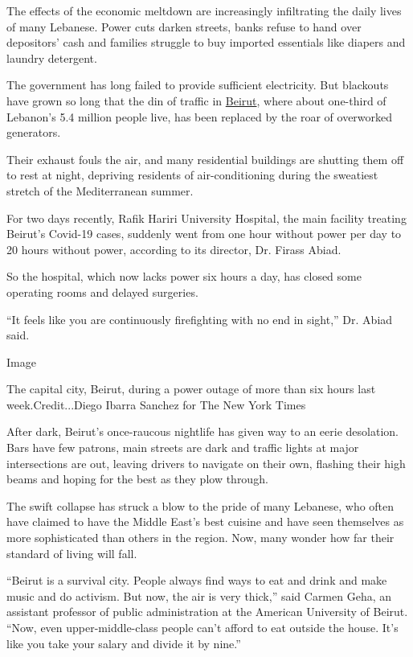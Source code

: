 The effects of the economic meltdown are increasingly infiltrating the
daily lives of many Lebanese. Power cuts darken streets, banks refuse to
hand over depositors' cash and families struggle to buy imported
essentials like diapers and laundry detergent.

The government has long failed to provide sufficient electricity. But
blackouts have grown so long that the din of traffic in
\href{https://www.nytimes3xbfgragh.onion/2020/08/04/world/middleeast/beirut-explosion-blast.html}{Beirut},
where about one-third of Lebanon's 5.4 million people live, has been
replaced by the roar of overworked generators.

Their exhaust fouls the air, and many residential buildings are shutting
them off to rest at night, depriving residents of air-conditioning
during the sweatiest stretch of the Mediterranean summer.

For two days recently, Rafik Hariri University Hospital, the main
facility treating Beirut's Covid-19 cases, suddenly went from one hour
without power per day to 20 hours without power, according to its
director, Dr. Firass Abiad.

So the hospital, which now lacks power six hours a day, has closed some
operating rooms and delayed surgeries.

``It feels like you are continuously firefighting with no end in
sight,'' Dr. Abiad said.

Image

The capital city, Beirut, during a power outage of more than six hours
last~ week.Credit...Diego Ibarra Sanchez for The New York Times

After dark, Beirut's once-raucous nightlife has given way to an eerie
desolation. Bars have few patrons, main streets are dark and traffic
lights at major intersections are out, leaving drivers to navigate on
their own, flashing their high beams and hoping for the best as they
plow through.

The swift collapse has struck a blow to the pride of many Lebanese, who
often have claimed to have the Middle East's best cuisine and have seen
themselves as more sophisticated than others in the region. Now, many
wonder how far their standard of living will fall.

``Beirut is a survival city. People always find ways to eat and drink
and make music and do activism. But now, the air is very thick,'' said
Carmen Geha, an assistant professor of public administration at the
American University of Beirut. ``Now, even upper-middle-class people
can't afford to eat outside the house. It's like you take your salary
and divide it by nine.''

